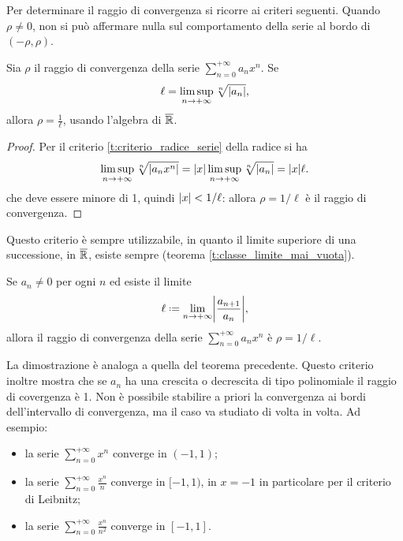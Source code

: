 Per determinare il raggio di convergenza si ricorre ai criteri seguenti.
Quando $\rho\neq 0$, non si può affermare nulla sul comportamento della serie al bordo di $(-\rho,\rho)$.
\begin{teorema}
Sia $\rho$ il raggio di convergenza della serie $\sum_{n=0}^{+\infty}a_nx^n$. Se
\[
\ell=\limsup_{n\to+\infty}\sqrt[n]{\lvert a_n\rvert},
\]
allora $\rho=\frac1{\ell}$, usando l'algebra di $\overline{\mathbb{R}}$.
\end{teorema}
\begin{proof}
Per il criterio \ref{t:criterio_radice_serie} della radice si ha
\[
\limsup_{n\to+\infty}\sqrt[n]{\lvert a_nx^n\rvert}=\lvert x\rvert\limsup_{n\to+\infty}\sqrt[n]{\lvert a_n\rvert}=\lvert x\rvert\ell.
\]
che deve essere minore di 1, quindi $\lvert x\rvert<1/\ell$: allora $\rho=1/\ell$ è il raggio di convergenza.
\end{proof}
Questo criterio è sempre utilizzabile, in quanto il limite superiore di una successione, in $\overline{\mathbb{R}}$, esiste sempre (teorema \ref{t:classe_limite_mai_vuota}).
\begin{teorema}
Se $a_n\neq 0$ per ogni $n$ ed esiste il limite
\[
	\ell\defeq\lim_{n\to+\infty}\abs[\bigg]{\frac{a_{n+1}}{a_n}},
\]
allora il raggio di convergenza della serie $\sum_{n=0}^{+\infty}a_nx^n$ è $\rho=1/\ell$.
\end{teorema}
La dimostrazione è analoga a quella del teorema precedente. Questo criterio inoltre mostra che se $a_n$ ha una crescita o decrescita di tipo polinomiale il raggio di covergenza è 1.
Non è possibile stabilire a priori la convergenza ai bordi dell'intervallo di convergenza, ma il caso va studiato di volta in volta. Ad esempio:
\begin{itemize}
\item la serie $\sum_{n=0}^{+\infty}x^n$ converge in $(-1,1)$;
\item la serie $\sum_{n=0}^{+\infty}\frac{x^n}{n}$ converge in $[-1,1)$, in $x=-1$ in particolare per il criterio di Leibnitz;
\item la serie $\sum_{n=0}^{+\infty}\frac{x^n}{n^2}$ converge in $[-1,1]$.
\end{itemize}

